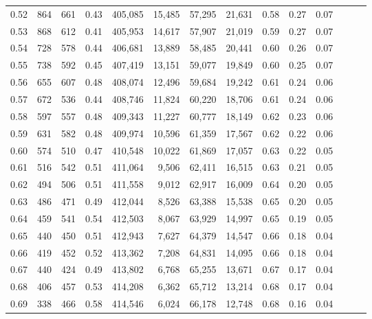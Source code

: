 \begin{tabular}{rrrrrrrrrrrrrr}
0.52 &     864 &    661 &  0.43 &  405,085 &   15,485 &  57,295 &  21,631 &  0.58 &  0.27 &      0.07 \\
0.53 &     868 &    612 &  0.41 &  405,953 &   14,617 &  57,907 &  21,019 &  0.59 &  0.27 &      0.07 \\
0.54 &     728 &    578 &  0.44 &  406,681 &   13,889 &  58,485 &  20,441 &  0.60 &  0.26 &      0.07 \\
0.55 &     738 &    592 &  0.45 &  407,419 &   13,151 &  59,077 &  19,849 &  0.60 &  0.25 &      0.07 \\
0.56 &     655 &    607 &  0.48 &  408,074 &   12,496 &  59,684 &  19,242 &  0.61 &  0.24 &      0.06 \\
0.57 &     672 &    536 &  0.44 &  408,746 &   11,824 &  60,220 &  18,706 &  0.61 &  0.24 &      0.06 \\
0.58 &     597 &    557 &  0.48 &  409,343 &   11,227 &  60,777 &  18,149 &  0.62 &  0.23 &      0.06 \\
0.59 &     631 &    582 &  0.48 &  409,974 &   10,596 &  61,359 &  17,567 &  0.62 &  0.22 &      0.06 \\
0.60 &     574 &    510 &  0.47 &  410,548 &   10,022 &  61,869 &  17,057 &  0.63 &  0.22 &      0.05 \\
0.61 &     516 &    542 &  0.51 &  411,064 &    9,506 &  62,411 &  16,515 &  0.63 &  0.21 &      0.05 \\
0.62 &     494 &    506 &  0.51 &  411,558 &    9,012 &  62,917 &  16,009 &  0.64 &  0.20 &      0.05 \\
0.63 &     486 &    471 &  0.49 &  412,044 &    8,526 &  63,388 &  15,538 &  0.65 &  0.20 &      0.05 \\
0.64 &     459 &    541 &  0.54 &  412,503 &    8,067 &  63,929 &  14,997 &  0.65 &  0.19 &      0.05 \\
0.65 &     440 &    450 &  0.51 &  412,943 &    7,627 &  64,379 &  14,547 &  0.66 &  0.18 &      0.04 \\
0.66 &     419 &    452 &  0.52 &  413,362 &    7,208 &  64,831 &  14,095 &  0.66 &  0.18 &      0.04 \\
0.67 &     440 &    424 &  0.49 &  413,802 &    6,768 &  65,255 &  13,671 &  0.67 &  0.17 &      0.04 \\
0.68 &     406 &    457 &  0.53 &  414,208 &    6,362 &  65,712 &  13,214 &  0.68 &  0.17 &      0.04 \\
0.69 &     338 &    466 &  0.58 &  414,546 &    6,024 &  66,178 &  12,748 &  0.68 &  0.16 &      0.04 \\

\end{tabular}
